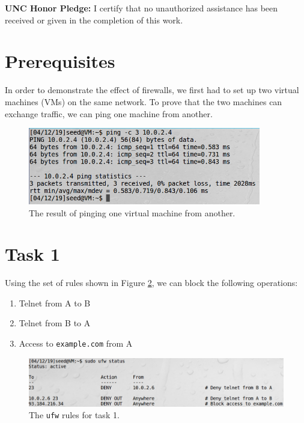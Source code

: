 \documentclass[12pt,letterpaper]{article}
\author{Chathan Driehuys}
\begin{document}
	\noindent \textbf{UNC Honor Pledge:} I certify that no unauthorized assistance has been received or given in the completion of this work.
	
	\vspace{.5in}
	
	\section*{Prerequisites}
		In order to demonstrate the effect of firewalls, we first had to set up two virtual machines (VMs) on the same network. To prove that the two machines can exchange traffic, we can ping one machine from another.
		
		\begin{figure}[h]
			\begin{center}
				\includegraphics[width=4in]{task-0-ping}
			\end{center}
			\caption{The result of pinging one virtual machine from another.}
			\label{fig:task-0-ping}
		\end{figure}
	
	\section*{Task 1}
		Using the set of rules shown in Figure \ref{fig:task-1-ufw-rules}, we can block the following operations:
		
		\begin{enumerate}
			\item Telnet from A to B
			\item Telnet from B to A
			\item Access to \texttt{example.com} from A
		\end{enumerate}
		
		\begin{figure}
			\begin{center}
				\includegraphics[width=\linewidth]{task-1-ufw-rules}
			\end{center}
			\caption{The \texttt{ufw} rules for task 1.}
			\label{fig:task-1-ufw-rules}
		\end{figure}
	
\end{document}
